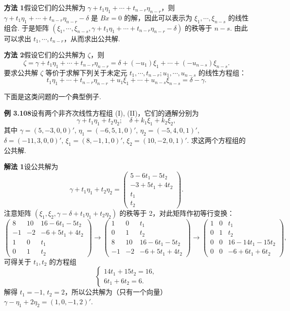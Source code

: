 \documentclass[UTF8, 12pt, fontset=fandol, oneside]{ctexart}
\begin{document}
\noindent\textbf{方法 1}\quad 假设它们的公共解为 $\gamma+t_1\eta_1+\cdots+t_{n-r}\eta_{n-r}$，则 $\gamma+t_1\eta_1+\cdots+t_{n-r}\eta_{n-r}-\delta$ 是 $Bx=0$ 的解，因此可以表示为 $\xi_1,\cdots,\xi_{n-s}$ 的线性组合. 于是矩阵 $(\xi_1,\cdots,\xi_{n-s},\gamma+t_1\eta_1+\cdots+t_{n-r}\eta_{n-r}-\delta)$ 的秩等于 $n-s$. 由此可以求出 $t_1,\cdots,t_{n-r}$，从而求出公共解.

\noindent\textbf{方法 2}\quad 假设它们的公共解为 $\zeta$，则
\[
\zeta=\gamma+t_1\eta_1+\cdots+t_{n-r}\eta_{n-r}
=\delta+(-u_1)\xi_1+\cdots+(-u_{n-s})\xi_{n-s}.
\]
要求公共解 $\zeta$ 等价于求解下列关于未定元 $t_1,\cdots,t_{n-r};u_1,\cdots,u_{n-s}$ 的线性方程组：
\[
t_1\eta_1+\cdots+t_{n-r}\eta_{n-r}+u_1\xi_1+\cdots+u_{n-s}\xi_{n-s}=\delta-\gamma.
\]

下面是这类问题的一个典型例子.

\noindent\textbf{例 3.108}\quad 设有两个非齐次线性方程组 (I), (II)，它们的通解分别为
\[
\gamma+t_1\eta_1+t_2\eta_2;\quad \delta+k_1\xi_1+k_2\xi_2,
\]
其中 $\gamma=(5,-3,0,0)'$, $\eta_1=(-6,5,1,0)'$, $\eta_2=(-5,4,0,1)'$, $\delta=(-11,3,0,0)'$, $\xi_1=(8,-1,1,0)'$, $\xi_2=(10,-2,0,1)'.$ 求这两个方程组的公共解.

\noindent\textbf{解法 1}\quad 设公共解为
\[
\gamma+t_1\eta_1+t_2\eta_2=
\begin{pmatrix}
5-6t_1-5t_2\\
-3+5t_1+4t_2\\
t_1\\
t_2
\end{pmatrix}.
\]
注意矩阵 $(\xi_1,\xi_2,\gamma-\delta+t_1\eta_1+t_2\eta_2)$ 的秩等于 2，对此矩阵作初等行变换：
\[
\begin{pmatrix}
8&10&16-6t_1-5t_2\\
-1&-2&-6+5t_1+4t_2\\
1&0&t_1\\
0&1&t_2
\end{pmatrix}
\to
\begin{pmatrix}
1&0&t_1\\
0&1&t_2\\
8&10&16-6t_1-5t_2\\
-1&-2&-6+5t_1+4t_2
\end{pmatrix}
\to
\begin{pmatrix}
1&0&t_1\\
0&1&t_2\\
0&0&16-14t_1-15t_2\\
0&0&-6+6t_1+6t_2
\end{pmatrix},
\]
可得关于 $t_1,t_2$ 的方程组
\[
\begin{cases}
14t_1+15t_2=16,\\
6t_1+6t_2=6.
\end{cases}
\]
解得 $t_1=-1$, $t_2=2$，所以公共解为（只有一个向量）$\gamma-\eta_1+2\eta_2=(1,0,-1,2)'$.
\end{document}
